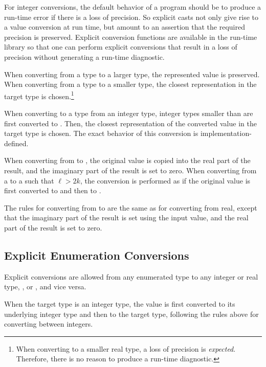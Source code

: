 \begin{rationale}
For integer conversions, the default behavior of a program should be to produce
a run-time error if there is a loss of precision.  So explicit casts not only
give rise to a value conversion at run time, but amount to an assertion
that the required precision is preserved.  Explicit conversion functions are
available in the run-time library so that one can perform explicit conversions that result in a loss
of precision without generating a run-time diagnostic.
\end{rationale}

When converting from a  type to a larger  type, the
represented value is preserved.  When converting from a  type to a
smaller  type, the closest representation in the target type is
chosen.\footnote{When converting to a smaller real type, a loss of precision is \emph{expected}.
Therefore, there is no reason to produce a run-time diagnostic.}

When converting to a  type from an integer type, integer types
smaller than  are first converted to .  Then, the closest
representation of the converted value in the target type is chosen.  The exact
behavior of this conversion is implementation-defined.

When converting from  to , the original
value is copied into the real part of the result, and the imaginary part of the
result is set to zero.  When converting from a  to
a  such that $\ell > 2k$, the conversion is performed as
if the original value is first converted to  and then
to \chpl{$\ell$}.

The rules for converting from  to  are the same as for
converting from real, except that the imaginary part of the result is set using
the input value, and the real part of the result is set to zero.

\subsection{Explicit Enumeration Conversions}
\label{Explicit_Enumeration_Conversions}

Explicit conversions are allowed from any enumerated type to any
integer or real type, , or , and vice versa.

When the target type is an integer type, the value is first converted to its
underlying integer type and then to the target type, following the rules above
for converting between integers.

